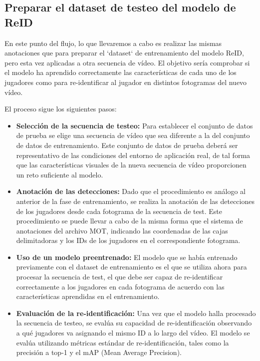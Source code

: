 \documentclass[12pt, a4paper, twoside]{article}
\begin{document}
	
	\subsection{Preparar el dataset de testeo del modelo de ReID} 
	
	En este punto del flujo, lo que llevaremos a cabo es realizar las mismas anotaciones que para preparar el `dataset` de entrenamiento del modelo ReID, pero esta vez aplicadas a otra secuencia de vídeo. El objetivo sería comprobar si el modelo ha aprendido correctamente las características de cada uno de los jugadores como para re-identificar al jugador en distintos fotogramas del nuevo vídeo.
	
	El proceso sigue los siguientes pasos:
	
	\begin{itemize}
		\item \textbf{Selección de la secuencia de testeo:} Para establecer el conjunto de datos de prueba se elige una secuencia de vídeo que sea diferente a la del conjunto de datos de entrenamiento. Este conjunto de datos de prueba deberá ser representativo de las condiciones del entorno de aplicación real, de tal forma que las características visuales de la nueva secuencia de vídeo proporcionen un reto suficiente al modelo.
		
		\item \textbf{Anotación de las detecciones:} Dado que el procedimiento es análogo al anterior de la fase de entrenamiento, se realiza la anotación de las detecciones de los jugadores desde cada fotograma de la secuencia de test. Este procedimiento se puede llevar a cabo de la misma forma que el sistema de anotaciones del archivo MOT, indicando las coordenadas de las cajas delimitadoras y los IDs de los jugadores en el correspondiente fotograma.
		
		\item \textbf{Uso de un modelo preentrenado:} El modelo que se había entrenado previamente con el dataset de entrenamiento es el que se utiliza ahora para procesar la secuencia de test, el que debe ser capaz de re-identificar correctamente a los jugadores en cada fotograma de acuerdo con las características aprendidas en el entrenamiento.
		
		\item \textbf{Evaluación de la re-identificación:} Una vez que el modelo halla procesado la secuencia de testeo, se evalúa su capacidad de re-identificación observando a qué jugadores va asignando el mismo ID a lo largo del vídeo. El modelo se evalúa utilizando métricas estándar de re-identificación, tales como la precisión a top-1 y el mAP (Mean Average Precision).
	\end{itemize}
	
\end{document}
